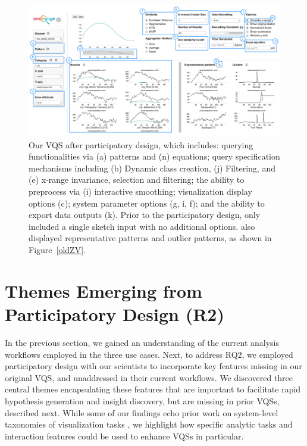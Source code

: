 \begin{figure}[ht!]
\centering
\vspace{-15pt}
\includegraphics[width=\linewidth]{figures/newZV.pdf} %
\vspace{-5pt}\caption{Our VQS after participatory design, which includes: querying functionalities via (a) patterns and (n) equations; query specification mechanisms including  (b) Dynamic class creation, (j) Filtering, and  (e) x-range invariance, selection and filtering; the ability to preprocess via (i) interactive smoothing; visualization display options (c); system parameter options (g, i, f); and the ability to export data outputs (k). Prior to the participatory design, \zv only included a single sketch input with no additional options. \zv also displayed representative patterns and outlier patterns, as shown in Figure~\ref{oldZV}.}
\label{zvOverview}
\vspace{-14pt}
\end{figure}

\section{Themes Emerging from Participatory Design (R2)}\label{findings}
\par In the previous section, we gained an understanding of the current analysis workflows employed in the three use cases. Next, to address RQ2, we employed participatory design with our scientists to incorporate key features  missing in our original VQS, and unaddressed in their
current workflows. We discovered three central themes encapsulating these features that are important to facilitate rapid hypothesis generation and insight discovery, but are missing in prior VQSs,  described next. While some of our findings echo prior work on system-level taxonomies of visualization tasks \cite{Amar2005,Heer2012}, we highlight how specific analytic tasks and interaction features could be used to enhance VQSs in particular. 
